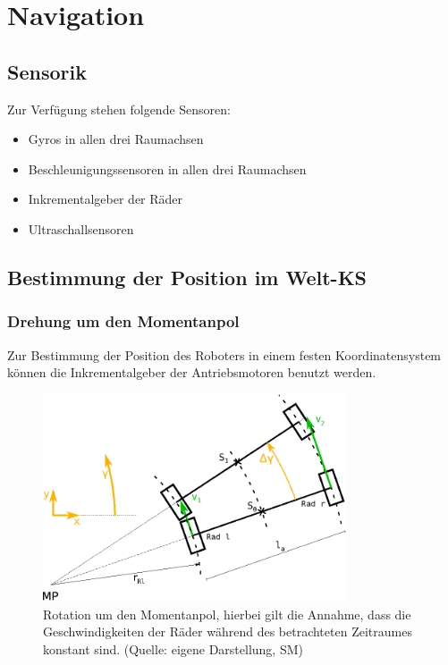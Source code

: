 \renewcommand{\autoren}{Stephan Morongowski}
\newpage
\section{Navigation}
\subsection{Sensorik}
Zur Verfügung stehen folgende Sensoren:
\begin{itemize}
\item Gyros in allen drei Raumachsen
\item Beschleunigungssensoren in allen drei Raumachsen
\item Inkrementalgeber der Räder
\item Ultraschallsensoren
\end{itemize}

\subsection{Bestimmung der Position im Welt-KS}

\subsubsection{Drehung um den Momentanpol}
\label{turningVelocityPole}
Zur Bestimmung der Position des Roboters in einem festen Koordinatensystem können die Inkrementalgeber der Antriebsmotoren benutzt werden.

\begin{figure}[h]  %
\centering\includegraphics[width=0.8\textwidth]{images/Kurvenkinematic.eps}
\caption[Rotation um den Momentanpol]{Rotation um den Momentanpol, hierbei gilt die Annahme, dass die Geschwindigkeiten der Räder während des betrachteten Zeitraumes konstant sind. \newline(Quelle: eigene Darstellung, SM)}
\label{kurvenkinematik}
\end{figure}

